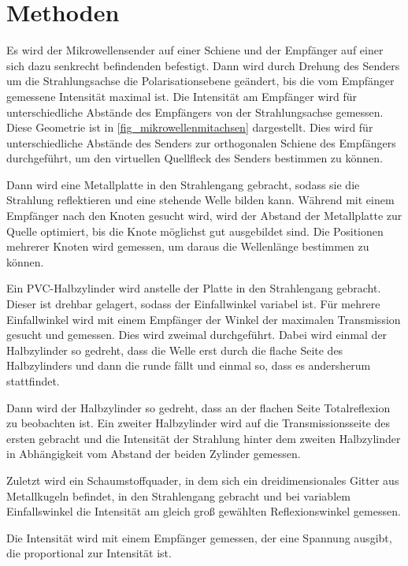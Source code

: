 \documentclass[
	a4paper,
	12pt,
	pagesize,
	ngerman
]{scrartcl}
\begin{document}
	\section{Methoden}
	Es wird der Mikrowellensender auf einer Schiene und der Empfänger auf  einer sich dazu senkrecht befindenden befestigt.
	Dann wird durch Drehung des Senders um die Strahlungsachse die Polarisationsebene geändert, bis die vom Empfänger gemessene Intensität maximal ist.
	Die Intensität am Empfänger wird für unterschiedliche Abstände des Empfängers von der Strahlungsachse gemessen.
	Diese Geometrie ist in \cref{fig_mikrowellenmitachsen} dargestellt.
	Dies wird für unterschiedliche Abstände des Senders zur orthogonalen Schiene des Empfängers durchgeführt, um den virtuellen Quellfleck des Senders bestimmen zu können.
	
	Dann wird eine Metallplatte in den Strahlengang gebracht, sodass sie die Strahlung reflektieren und eine stehende Welle bilden kann.
	Während mit einem Empfänger nach den Knoten gesucht wird, wird der Abstand der Metallplatte zur Quelle optimiert, bis die Knote möglichst gut ausgebildet sind. %
	Die Positionen mehrerer Knoten wird gemessen, um daraus die Wellenlänge bestimmen zu können. %
	
	Ein PVC-Halbzylinder wird anstelle der Platte in den Strahlengang gebracht.
	Dieser ist drehbar gelagert, sodass der Einfallwinkel variabel ist.
	Für mehrere Einfallwinkel wird mit einem Empfänger der Winkel der maximalen Transmission gesucht und gemessen.
	Dies wird zweimal durchgeführt.
	Dabei wird einmal der Halbzylinder so gedreht, dass die Welle erst durch die flache Seite des Halbzylinders und dann die runde fällt und einmal so, dass es andersherum stattfindet.
	
	Dann wird der Halbzylinder so gedreht, dass an der flachen Seite Totalreflexion zu beobachten ist. %
	Ein zweiter Halbzylinder wird auf die Transmissionsseite des ersten gebracht und die Intensität der Strahlung hinter dem zweiten Halbzylinder in Abhängigkeit vom Abstand der beiden Zylinder gemessen.
	
	Zuletzt wird ein Schaumstoffquader, in dem sich ein dreidimensionales Gitter aus Metallkugeln befindet, in den Strahlengang gebracht und bei variablem Einfallswinkel die Intensität am gleich groß gewählten Reflexionswinkel gemessen.
	
	Die Intensität wird mit einem Empfänger gemessen, der eine Spannung ausgibt, die proportional zur Intensität ist.
	
\end{document}
